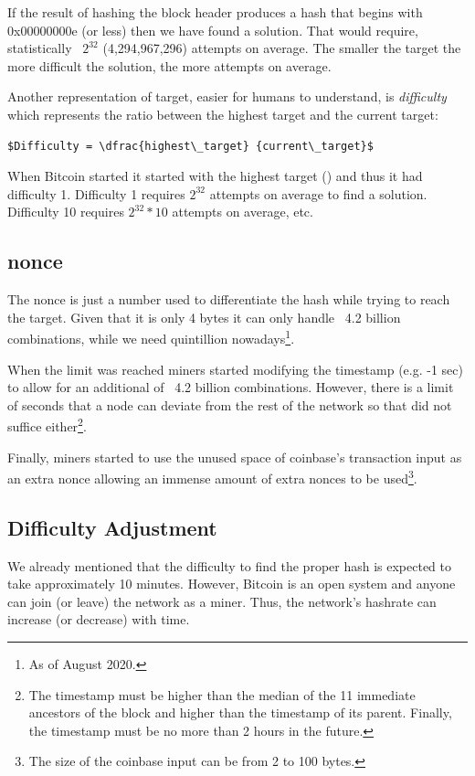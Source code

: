 If the result of hashing the block header produces a hash that begins with 0x00000000e (or less) then we have found a solution. That would require, statistically ~$2^{32}$ (4,294,967,296) attempts on average. The smaller the target the more difficult the solution, the more attempts on average.

Another representation of target, easier for humans to understand, is \emph{difficulty} which represents the ratio between the highest target and the current target:

\begin{emphbox}
\begin{lstlisting}[style=Pseudomath]
$Difficulty = \dfrac{highest\_target} {current\_target}$
\end{lstlisting}
\end{emphbox}

When Bitcoin started it started with the highest target () and thus it had difficulty 1. Difficulty 1 requires $2^{32}$ attempts on average to find a solution. Difficulty 10 requires $2^{32} * 10$ attempts on average, etc.

\subsection*{nonce}
The nonce is just a number used to differentiate the hash while trying to reach the target. Given that it is only 4 bytes it can only handle ~4.2 billion combinations, while we need quintillion nowadays\footnote{As of August 2020.}.

When the limit was reached miners started modifying the timestamp (e.g. -1 sec) to allow for an additional of ~4.2 billion combinations. However, there is a limit of seconds that a node can deviate from the rest of the network so that did not suffice either\footnote{The timestamp must be higher than the median of the 11 immediate ancestors of the block and higher than the timestamp of its parent. Finally, the timestamp must be no more than 2 hours in the future.}.

Finally, miners started to use the unused space of coinbase's transaction input as an extra nonce allowing an immense amount of extra nonces to be used\footnote{The size of the coinbase input can be from 2 to 100 bytes.}. 


\subsection*{Difficulty Adjustment}
We already mentioned that the difficulty to find the proper hash is expected to take approximately 10 minutes. However, Bitcoin is an open system and anyone can join (or leave) the network as a miner. Thus, the network’s hashrate can increase (or decrease) with time. 

